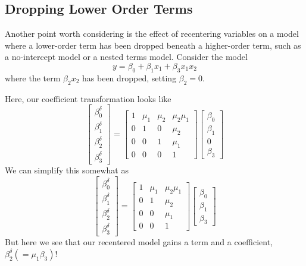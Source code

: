 \documentclass[]{article}
\begin{document}
\hypertarget{dropping-lower-order-terms}{%
\subsection{Dropping Lower Order
Terms}\label{dropping-lower-order-terms}}

Another point worth considering is the effect of recentering variables
on a model where a lower-order term has been dropped beneath a
higher-order term, such as a no-intercept model or a nested terms model.
Consider the model \[y = \beta_0 + \beta_1x_1 + \beta_3x_1x_2\] where
the term \(\beta_2x_2\) has been dropped, setting \(\beta_2=0\).

Here, our coefficient transformation looks like
\[\begin{bmatrix}\beta_0^\delta \\ \beta_1^\delta \\ \beta_2^\delta \\ \beta_3^\delta \end{bmatrix}=
\begin{bmatrix} 1 & \mu_1 &\mu_2 &\mu_2\mu_1 \\
  0 &1 &0 &\mu_2 \\ 0 &0 &1 &\mu_1 \\ 0 &0 &0 &1 \end{bmatrix}
\begin{bmatrix}\beta_0 \\ \beta_1 \\ 0 \\ \beta_3 \end{bmatrix}\] We can
simplify this somewhat as
\[\begin{bmatrix}\beta_0^\delta \\ \beta_1^\delta \\ \beta_2^\delta \\ \beta_3^\delta \end{bmatrix}=
\begin{bmatrix} 1 & \mu_1 &\mu_2\mu_1 \\
  0 &1 &\mu_2 \\ 0 &0 &\mu_1 \\ 0 &0 &1 \end{bmatrix}
\begin{bmatrix}\beta_0 \\ \beta_1 \\ \beta_3 \end{bmatrix}\] But here we
see that our recentered model gains a term and a coefficient,
\(\beta_2^\delta (=\mu_1\beta_3)\)!
\end{document}
